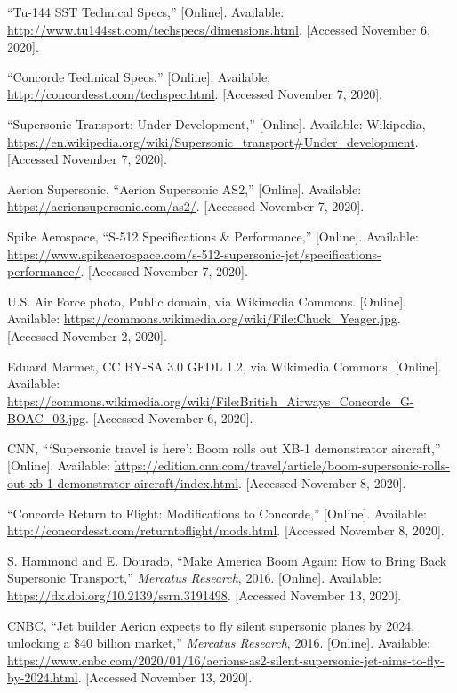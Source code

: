 \documentclass[a4paper,11pt]{article}
\begin{document}
\begin{thebibliography}
{``Tu-144 SST Technical Specs,''}
[Online]. Available:
\url{http://www.tu144sst.com/techspecs/dimensions.html}.
[Accessed November 6, 2020].

{``Concorde Technical Specs,''}
[Online]. Available:
\url{http://concordesst.com/techspec.html}.
[Accessed November 7, 2020].

{``Supersonic Transport: Under Development,''}
[Online]. Available: Wikipedia,
\url{https://en.wikipedia.org/wiki/Supersonic_transport#Under_development}.
[Accessed November 7, 2020].

{Aerion Supersonic,}
{``Aerion Supersonic AS2,''}
[Online]. Available:
\url{https://aerionsupersonic.com/as2/}.
[Accessed November 7, 2020].

{Spike Aerospace,}
{``S-512 Specifications \& Performance,''}
[Online]. Available:
\url{https://www.spikeaerospace.com/s-512-supersonic-jet/specifications-performance/}.
[Accessed November 7, 2020].

{U.S. Air Force photo, Public domain, via Wikimedia Commons.}
[Online]. Available:
\url{https://commons.wikimedia.org/wiki/File:Chuck_Yeager.jpg}.
[Accessed November 2, 2020].

{Eduard Marmet, CC BY-SA 3.0 GFDL 1.2, via Wikimedia Commons.}
[Online]. Available:
\url{https://commons.wikimedia.org/wiki/File:British_Airways_Concorde_G-BOAC_03.jpg}.
[Accessed November 6, 2020].

{CNN,}
{```Supersonic travel is here': Boom rolls out XB-1 demonstrator aircraft,''}
[Online]. Available:
\url{https://edition.cnn.com/travel/article/boom-supersonic-rolls-out-xb-1-demonstrator-aircraft/index.html}.
[Accessed November 8, 2020].

{``Concorde Return to Flight: Modifications to Concorde,''}
[Online]. Available:
\url{http://concordesst.com/returntoflight/mods.html}.
[Accessed November 8, 2020].

{S. Hammond and E. Dourado},
{``Make America Boom Again: How to Bring Back Supersonic Transport,''} \textit{Mercatus Research}, 2016.
[Online]. Available:
\url{https://dx.doi.org/10.2139/ssrn.3191498}.
[Accessed November 13, 2020].

{CNBC},
{``Jet builder Aerion expects to fly silent supersonic planes by 2024, unlocking a \$40 billion market,''} \textit{Mercatus Research}, 2016.
[Online]. Available:
\url{https://www.cnbc.com/2020/01/16/aerions-as2-silent-supersonic-jet-aims-to-fly-by-2024.html}.
[Accessed November 13, 2020].


\end{thebibliography}
\end{document}
